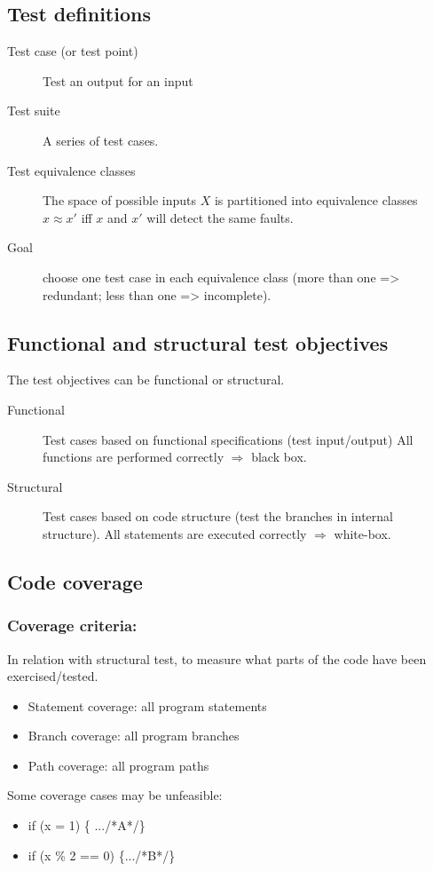 \subsection{Test definitions}

\begin{description}
    \item[Test case (or test point)] Test an output for an input
    \item[Test suite] A series of test cases.
    \item[Test equivalence classes] The space of possible inputs $X$ is partitioned into equivalence classes $x \approx x'$ iff $x$ and $x'$ will detect the same faults.
    \item[Goal] choose one test case in each equivalence class (more than one => redundant; less than one => incomplete).
\end{description}

\subsection{Functional and structural test objectives}
The test objectives can be functional or structural. 

\begin{description}
    \item[Functional] Test cases based on functional specifications
        (test input/output)
        \subitem{} All functions are performed correctly $\Rightarrow$ black box.
    \item[Structural] Test cases based on code structure (test the
        branches in internal structure).
        \subitem{} All statements are executed correctly $\Rightarrow$ white-box.
\end{description}


\subsection{Code coverage}

\subsubsection{Coverage criteria:}
In relation with structural test, to measure what parts of the code have been
exercised/tested.

\begin{itemize}
    \item Statement coverage: all program statements
    \item Branch coverage: all program branches
    \item Path coverage: all program paths
\end{itemize}
Some coverage cases may be unfeasible:
\begin{itemize}
	\item if (x = 1) \{ .../*A*/\}
	\item if (x \% 2 == 0) \{.../*B*/\}
\end{itemize}

